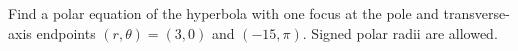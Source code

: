 Find a polar equation of the hyperbola with one focus at the pole and transverse-axis endpoints $(r,\theta)=(3,0)$ and $(-15,\pi)$. Signed polar radii are allowed.
